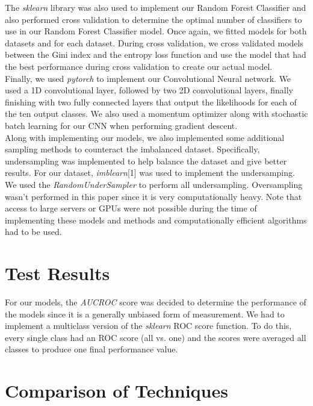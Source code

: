 \documentclass[conference]{IEEEtran}
\begin{document}
The \emph{sklearn} library was also used to implement our Random Forest Classifier and also performed cross validation to determine the optimal number of classifiers to use in our Random Forest Classifier model. Once again, we fitted models for both datasets and for each dataset. During cross validation, we cross validated models between the Gini index and the entropy loss function and use the model that had the best performance during cross validation to create our actual model. \\

Finally, we used \emph{pytorch} to implement our Convolutional Neural network. We used a 1D convolutional layer, followed by two 2D convolutional layers, finally finishing with two fully connected layers that output the likelihoods for each of the ten output classes. We also used a momentum optimizer along with stochastic batch learning for our CNN when performing gradient descent. \\

Along with implementing our models, we also implemented some additional sampling methods to counteract the imbalanced dataset. Specifically, undersampling was implemented to help balance the dataset and give better results. For our dataset, \emph{imblearn}[1] was used to implement the undersamping. We used the \emph{RandomUnderSampler} to perform all undersampling. Oversampling wasn't performed in this paper since it is very computationally heavy. Note that access to large servers or GPUs were not possible during the time of implementing these models and methods and computationally efficient algorithms had to be used. \\

\section{Test Results}

For our models, the \emph{AUCROC} score was decided to determine the performance of the models since it is a generally unbiased form of measurement. We had to implement a multiclass version of the \emph{sklearn} ROC score function. To do this, every single class had an ROC score (all vs. one) and the scores were averaged all classes to produce one final performance value. 

\section{Comparison of Techniques}
\end{document}
